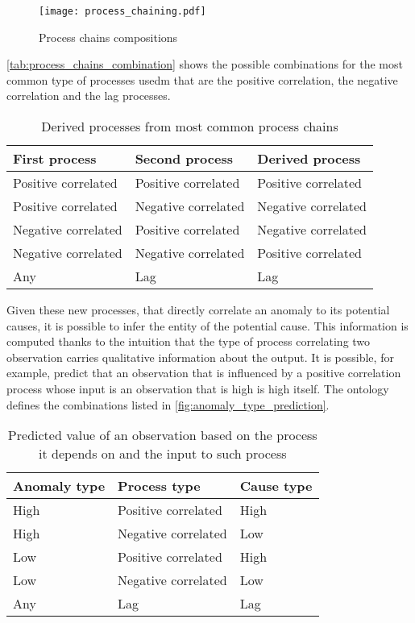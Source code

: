 \begin{figure}
  \centering
  \texttt{[image: process\_chaining.pdf]}
  \caption{Process chains compositions}
  \label{fig:chain_composition}
\end{figure}
\autoref{tab:process_chains_combination} shows the possible combinations for the most common type of processes usedm that are the positive correlation, the negative correlation and the lag processes.
\begin{table}
  \centering
  \caption{Derived processes from most common process chains}
  \label{tab:process_chains_combination}
  \begin{tabular}{lll}
    \hline\textbf{First process} & \textbf{Second process} & \textbf{Derived process}\\\hline
    Positive correlated & Positive correlated & Positive correlated\\
    Positive correlated & Negative correlated & Negative correlated\\
    Negative correlated & Positive correlated & Negative correlated\\
    Negative correlated & Negative correlated & Positive correlated\\
    Any & Lag & Lag \\\hline
  \end{tabular}
\end{table}
Given these new processes, that directly correlate an anomaly to its potential causes, it is possible to infer the entity of the potential cause. This information is computed thanks to the intuition that the type of process correlating two observation carries qualitative information about the output. It is possible, for example, predict that an observation that is influenced by a positive correlation process whose input is an observation that is high is high itself. The ontology defines the combinations listed in \autoref{fig:anomaly_type_prediction}.
\begin{table}
  \centering
  \caption{Predicted value of an observation based on the process it depends on and the input to such process}
  \label{fig:anomaly_type_prediction}
  \begin{tabular}{lll}
    \hline\textbf{Anomaly type} & \textbf{Process type} & \textbf{Cause type}\\\hline
    High & Positive correlated & High\\
    High & Negative correlated & Low\\
    Low & Positive correlated & High\\
    Low & Negative correlated & Low \\
    Any & Lag & Lag \\\hline
  \end{tabular}
\end{table}
